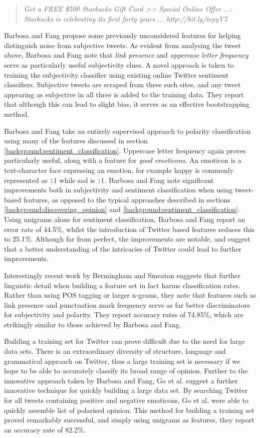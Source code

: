 \begin{quote}
	\emph{Get a FREE \$500 Starbucks Gift Card >> Special Online Offer ...: Starbucks is celebrating its first forty years ... http://bit.ly/iepyV5}
\end{quote}

Barbosa and Fang propose some previously unconsidered features for helping distinguish noise from subjective tweets. As evident from analysing the tweet above, Barbosa and Fang note that \emph{link presence} and \emph{uppercase letter frequency} serve as particularly useful subjectivity clues. A novel approach is taken to training the subjectivity classifier using existing online Twitter sentiment classifiers. Subjective tweets are scraped from three such sites, and any tweet appearing as subjective in all three is added to the training data. They report that although this can lead to slight bias, it serves as an effective bootstrapping method. 

Barbosa and Fang take an entirely supervised approach to polarity classification using many of the features discussed in section \ref{background:sentiment_classification}. Uppercase letter frequency again proves particularly useful, along with a feature for \emph{good emoticons}. An emoticon is a text-character face expressing an emotion, for example happy is commonly represented as \texttt{:)} while sad is \texttt{:(}. Barbosa and Fang note significant improvements both in subjectivity and sentiment classification when using tweet-based features, as opposed to the typical approaches described in sections \ref{background:discovering_opinion} and \ref{background:sentiment_classification}. Using unigrams alone for sentiment classification, Barbosa and Fang report an error rate of 44.5\%, whilst the introduction of Twitter based features reduces this to 25.1\%. Although far from perfect, the improvements are notable, and suggest that a better understanding of the intricacies of Twitter could lead to further improvements.

Interestingly recent work by Bermingham and Smeaton \cite{Bermingham:2010vh} suggests that further linguistic detail when building a feature set in fact harms classification rates. Rather than using POS tagging or larger n-grams, they note that features such as link presence and punctuation mark frequency serve as far better discriminators for subjectivity and polarity. They report accuracy rates of 74.85\%, which are strikingly similar to those achieved by Barbosa and Fang. 

Building a training set for Twitter can prove difficult due to the need for large data sets. There is an extraordinary diversity of structure, language and grammatical approach on Twitter, thus a large training set is necessary if we hope to be able to accurately classify its broad range of opinion. Further to the innovative approach taken by Barbosa and Fang, Go et al. \cite{Go:2009ut} suggest a further innovative technique for quickly building a large data set. By searching Twitter for all tweets containing positive and negative emoticons, Go et al. were able to quickly assemble list of polarised opinion. This method for building a training set proved remarkably successful, and simply using unigrams as features, they report an accuracy rate of 82.2\%. 

